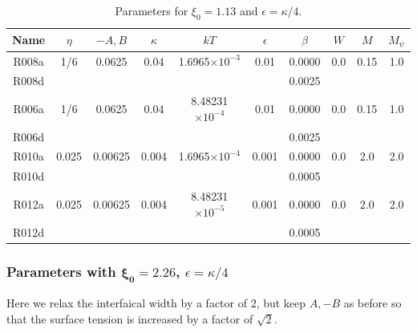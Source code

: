 \begin{table}[h]
\begin{center}
\begin{tabular}{|c|c|c|c|c|c|c|c|c|c|}
\hline
Name & $\eta$ & $-A,B$ & $\kappa$ & $kT$ & $\epsilon$ & $\beta$ & $W$
     & $M$ & $M_\psi$\\
\hline
R008a & 1/6 & 0.0625 & 0.04 & 1.6965$\times 10^{-3}$ & 0.01 & 0.0000 & 0.0 
      & 0.15 & 1.0 \\
R008d &  &  &  & & & 0.0025 &  &  &  \\
\hline
R006a & 1/6 & 0.0625 & 0.04 & 8.48231$\times 10^{-4}$ & 0.01 & 0.0000 & 0.0 
      & 0.15 & 1.0 \\
R006d & &  &  &  & & 0.0025 &  &  &  \\
\hline
R010a & 0.025 & 0.00625 & 0.004 & 1.6965$\times 10^{-4}$ & 0.001
      & 0.0000 & 0.0 & 2.0 & 2.0 \\
R010d & &  &  &  & & 0.0005 &  &  &  \\
\hline
R012a & 0.025 & 0.00625 & 0.004 & 8.48231$\times 10^{-5}$ & 0.001
      & 0.0000 & 0.0 & 2.0 & 2.0 \\
R012d & &  &  &  & & 0.0005 &  &  &  \\
\hline
\end{tabular}
\caption{Parameters for $\xi_0 = 1.13$ and $\epsilon = \kappa/4$.}
\end{center}
\end{table}



\subsubsection{Parameters with $\mathbf{\xi_0 = 2.26}$, $\epsilon = \kappa/4$}

Here we relax the interfaical width by a factor of 2, but
keep $A,-B$ as before so that the surface tension is increased
by a factor of $\sqrt{2}$.

